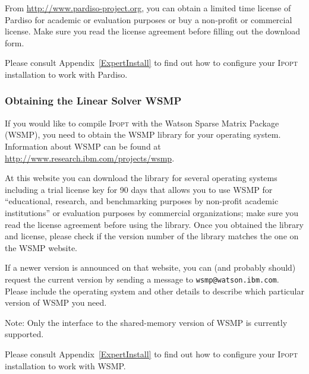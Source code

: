 \documentclass[10pt]{article}
\newcommand{\Ipopt}{\textsc{Ipopt}\xspace}
\begin{document}
From \url{http://www.pardiso-project.org},
you can obtain a limited time license of Pardiso for academic or
evaluation purposes or buy a non-profit or commercial
license. Make sure you read the license agreement before filling out
the download form.


Please consult Appendix~\ref{ExpertInstall} to find out how to
configure your \Ipopt installation to work with Pardiso.

\subsubsection{Obtaining the Linear Solver WSMP}\label{sec:WSMP}

If you would like to compile \Ipopt with the Watson Sparse Matrix
Package (WSMP), you need to obtain the WSMP library for your operating
system.  Information about WSMP can be found at
\url{http://www.research.ibm.com/projects/wsmp}.

At this website you can download the library for several operating systems
including a trial license key for 90 days that allows you to use WSMP
for ``educational, research, and benchmarking purposes by
non-profit academic institutions'' or evaluation purposes by commercial
organizations;
make sure you read the license agreement before using the library.
Once you obtained the library and license, please check if the version
number of the library matches the one on the WSMP website.

If a newer version is announced on that website, you can (and
probably should) request the current version by sending a message to
\verb|wsmp@watson.ibm.com|.  Please include the operating system and
other details to describe which particular version of WSMP you need.


Note: Only the interface to the shared-memory version of WSMP is
currently supported.

Please consult Appendix~\ref{ExpertInstall} to find out how to
configure your \Ipopt installation to work with WSMP.
\end{document}
